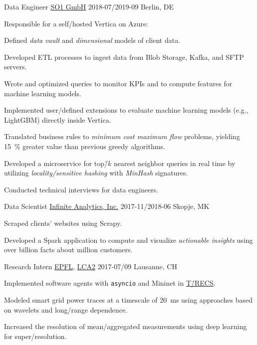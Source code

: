 \documentclass[%
version=last,%
fontsize=11pt,%
paper=A4,%
areasetadvanced,%
headinclude=false,%
footinclude=false,%
headlines=0,%
footlines=0,%
toc=bibnumbered,%
]{scrartcl}
\begin{document}
\begin{minipage}[t]{0.575\textwidth}
  \WorkEntry%
  {Data Engineer}%
  {\href{https://www.so1.ai/en/}{SO1 GmbH}}%
  {2018-07/2019-09}%
  {Berlin, DE}%
  {%
    \begin{Items}
    \item Responsible for a self\-/hosted Vertica on Azure:
      \begin{Items}
      \item Defined \emph{data vault} and \emph{dimensional} models of client
        data.
      \item Developed ETL processes to ingest data from Blob Storage, Kafka, and
        SFTP servers.
      \item Wrote and optimized queries to monitor KPIs and to compute features
        for machine learning models.
      \item Implemented user\-/defined extensions to evaluate machine learning
        models (e.g., LightGBM) directly inside Vertica.
      \end{Items}
    \item Translated business rules to \emph{minimum cost maximum flow}
      problems, yielding \SI{15}{\percent} greater value than previous greedy
      algorithms.
    \item Developed a microservice for top\=/\(k\) nearest neighbor queries in
      real time by utilizing \emph{locality\-/sensitive hashing} with
      \emph{MinHash} signatures.
    \item Conducted technical interviews for data engineers.
    \end{Items}%
  }

  \WorkEntry%
  {Data Scientist}%
  {\href{http://infiniteanalytics.com/}{Infinite Analytics, Inc.}}%
  {2017-11/2018-06}%
  {Skopje, MK}%
  {%
    \begin{Items}
    \item Scraped clients’ websites using Scrapy.
    \item Developed a Spark application to compute and visualize
      \emph{actionable insights} using over  billion facts about
       million customers.
    \end{Items}%
  }

  \WorkEntry%
  {Research Intern}%
  {\href{https://epfl.ch/}{EPFL}, \href{http://lca.epfl.ch/}{LCA2}}%
  {2017-07/09}%
  {Lausanne, CH}%
  {%
    \begin{Items}
    \item Implemented software agents with \texttt{asyncio} and
      Mininet in
      \href{https://www.epfl.ch/labs/desl-pwrs/smartgrid/t-recs/}{T\=/RECS}.
    \item Modeled smart grid power traces at a timescale of \SI{20}{\ms} using
      approaches based on wavelets and long\-/range dependence.
    \item Increased the resolution of mean\-/aggregated measurements using deep
      learning for super\-/resolution.
    \end{Items}%
  }
\end{minipage}%
\end{document}
